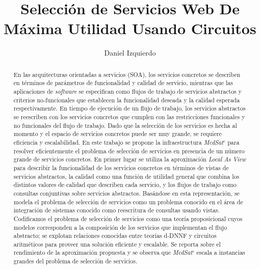 \documentclass{llncs}
\begin{document}
\allowdisplaybreaks
\title{Selección de Servicios Web De Máxima Utilidad Usando Circuitos}
\author{Daniel Izquierdo}

 \maketitle
\begin{abstract}
En las arquitecturas orientadas a servicios (SOA), los servicios concretos se
describen en términos de parámetros de funcionalidad y calidad de servicio,
mientras que las aplicaciones de \emph{software} se especifican como flujos de
trabajo de servicios abstractos y criterios no-funcionales que establecen la
funcionalidad deseada y la calidad esperada respectivamente. En tiempo de
ejecución de un flujo de trabajo, los servicios abstractos se reescriben con los
servicios concretos que cumplen con las restricciones funcionales y no
funcionales del flujo de trabajo. Dado que la selección de los servicios es
hecha al momento y el espacio de servicios concretos puede ser muy grande, se
requiere eficiencia y escalabilidad. En este trabajo se propone la
infraestructura {\it McdSat}$^c$ para resolver eficientemente el problema de
selección de servicios en presencia de un número grande de servicios concretos.
En primer lugar se utiliza la aproximación \emph{Local As View} para describir
la funcionalidad de los servicios concretos en términos de vistas de servicios
abstractos, la calidad como una función de utilidad general que combina los
distintos valores de calidad que describen cada servicio, y los flujos de
trabajo como consultas conjuntivas sobre servicios abstractos. Basándose en esta
representación, se modela el problema de selección de servicios como un problema
conocido en el área de integración de sistemas conocido como reescritura de
consultas usando vistas. Codificamos el problema de selección de servicios como
una teoría proposicional cuyos modelos corresponden a la composición de los
servicios que implementan el flujo abstracto; se explotan relaciones conocidas
entre teorías d-DNNF y circuitos aritméticos para proveer una solución eficiente
y escalable. Se reporta sobre el rendimiento de la aproximación propuesta y se
observa que  {\it McdSat}$^c$  escala a instancias grandes del problema de
selección de servicios.

\end{abstract}                
\end{document}
